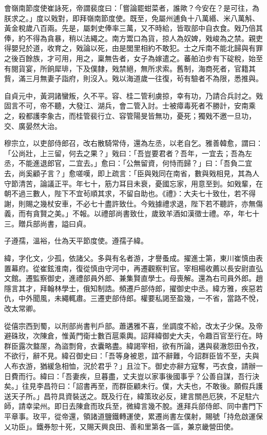 \begin{pinyinscope}
 會嶺南節度使崔詠死，帝謂裴度曰：「嘗論罷蚶菜者，誰歟？今安在？是可往，為朕求之。」度以戣對，即拜嶺南節度使。既至，免屬州逋負十八萬緡、米八萬斛、黃金稅歲八百兩。先是，屬刺史俸率三萬，又不時給，皆取部中自衣食。戣乃倍其俸，約不得為貪暴，稍以法繩之。南方鬻口為貨，掠人為奴婢，戣峻為之禁。親吏得嬰兒於道，收育之，戣論以死，由是閭里相約不敢犯。士之斥南不能北歸與有罪之後百餘族，才可用，用之，稟無告者，女子為嫁遣之。蕃舶泊步有下碇稅，始至有閱貨宴，所餉犀琲，下及僕隸，戣禁絕，無所求索。舊制，海商死者，官籍其貲，滿三月無妻子詣府，則沒入。戣以海道歲一往復，茍有驗者不為限，悉推與。



 自貞元中，黃洞諸蠻叛，久不平。容、桂二管利虜掠，幸有功，乃請合兵討之。戣固言不可，帝不聽，大發江、湖兵，會二管入討。士被瘴毒死者不勝計，安南乘之，殺都護李象古，而桂管裴行立、容管陽旻皆無功，憂死；獨戣不邀一旦功，交、廣晏然大治。



 穆宗立，以吏部侍郎召，改右散騎常侍，還為左丞，以老自乞。雅善韓愈，謂曰：「公尚壯，上三留，何去之果？」戣曰：「吾豈要君者？吾年，一宜去；吾為左丞，不能進退郎官，二宜去。」愈曰：「公無留資，何恃而歸？」曰：「吾負二宜去，尚奚顧子言？」愈嗟嘆，即上疏言：「臣與戣同在南省，數與戣相見，其為人守節清苦，論議正平。年七十，筋力耳目未衰，憂國忘家，用意至到。如戣輩，在朝不過三數人，陛下不宜茍順其求，不留自助也。《禮》：大夫七十致仕，若不得謝，則賜之幾杖安車，不必七十盡許致仕。今戣據禮求退，陛下若不聽許，亦無傷義，而有貪賢之美。」不報。以禮部尚書致仕，歲致羊酒如漢徵士禮。卒，年七十三。贈兵部尚書，謚曰貞。



 子遵孺，溫裕，仕為天平節度使。遵孺子緯。



 緯，字化文，少孤，依諸父。多與有名者游，才譽蚤成。擢進士第，東川崔慎由表置幕府。從崔鉉淮南，復從慎由守河中，再遷觀察判官。宰相楊收薦以長安尉直弘文館。遷監察御史，進禮部員外郎、兼集賢直學士。母喪解。還為右司員外郎。趙隱言其才，拜翰林學士，俄知制誥。頻遷戶部侍郎，擢御史中丞。緯方雅，疾惡若仇，中外聞風，未繩輒肅。三遷吏部侍郎。權要私謁至盈幾，一不省，當路不悅，改太常卿。



 從僖宗西到蜀，以刑部尚書判戶部。蕭遘雅不喜，坐調度不給，改太子少保。及帝避硃玫，次陳倉，惟黃門衛士數百扈乘輿。詔拜緯御史大夫，令趣百官至行在。時群臣露次盩厔，為盜剽脅，衣囊略盡。緯謁宰相，欲有所論，遘與裴澈怨田令孜，不欲行，辭不見。緯召御史曰：「吾等身被恩，誼不辭難，今詔群臣皆不至，夫與人布衣游，猶緩急相恤，況於君乎？」且泣下。御史亦辭方寇奪，丐衣食，請辦一日費而行。緯曰：「吾妻疾，旦暮盡，丈夫豈以家事後國事乎？公善自謀，吾行決矣。」往見李昌符曰：「詔書再至，而群臣顧未行。僕，大夫也，不敢後。願假兵護送天子所。」昌符具資裝送之。既及行在，緯策玫必反，建言關邑厄狹，不足駐六師，請幸梁州。即日去陳倉而玫兵至，微緯言幾不脫。進拜兵部侍郎、同中書門下平章事。玫平，從帝還，領諸道鹽鐵轉運使，累遷尚書左僕射，賜號「持危啟運保乂功臣」。鐵券恕十死，又賜天興良田、善和里第各一區，兼京畿營田使。




\end{pinyinscope}
